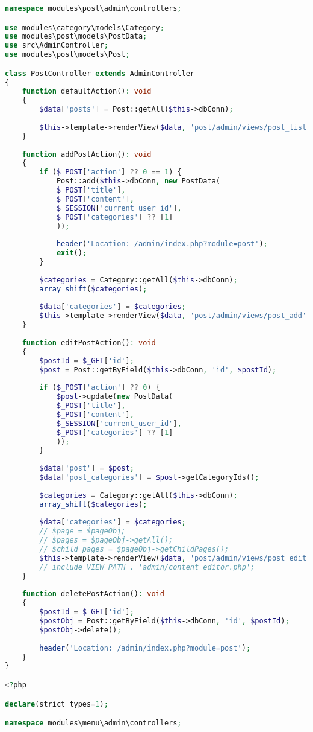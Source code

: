 \begin{lstlisting}[language=PHP, frame=none]
namespace modules\post\admin\controllers;

use modules\category\models\Category;
use modules\post\models\PostData;
use src\AdminController;
use modules\post\models\Post;

class PostController extends AdminController
{
	function defaultAction(): void
	{
		$data['posts'] = Post::getAll($this->dbConn);
		
		$this->template->renderView($data, 'post/admin/views/post_list');
	}
	
	function addPostAction(): void
	{
		if ($_POST['action'] ?? 0 == 1) {
			Post::add($this->dbConn, new PostData(
			$_POST['title'],
			$_POST['content'],
			$_SESSION['current_user_id'],
			$_POST['categories'] ?? [1]
			));
			
			header('Location: /admin/index.php?module=post');
			exit();
		}
		
		$categories = Category::getAll($this->dbConn);
		array_shift($categories);
		
		$data['categories'] = $categories;
		$this->template->renderView($data, 'post/admin/views/post_add');
	}
	
	function editPostAction(): void
	{
		$postId = $_GET['id'];
		$post = Post::getByField($this->dbConn, 'id', $postId);
		
		if ($_POST['action'] ?? 0) {
			$post->update(new PostData(
			$_POST['title'],
			$_POST['content'],
			$_SESSION['current_user_id'],
			$_POST['categories'] ?? [1]
			));
		}
		
		$data['post'] = $post;
		$data['post_categories'] = $post->getCategoryIds();
		
		$categories = Category::getAll($this->dbConn);
		array_shift($categories);
		
		$data['categories'] = $categories;
		// $page = $pageObj;
		// $pages = $pageObj->getAll();
		// $child_pages = $pageObj->getChildPages();
		$this->template->renderView($data, 'post/admin/views/post_edit');
		// include VIEW_PATH . 'admin/content_editor.php';
	}
	
	function deletePostAction(): void
	{
		$postId = $_GET['id'];
		$postObj = Post::getByField($this->dbConn, 'id', $postId);
		$postObj->delete();
		
		header('Location: /admin/index.php?module=post');
	}
}

<?php

declare(strict_types=1);

namespace modules\menu\admin\controllers;


\end{lstlisting}
